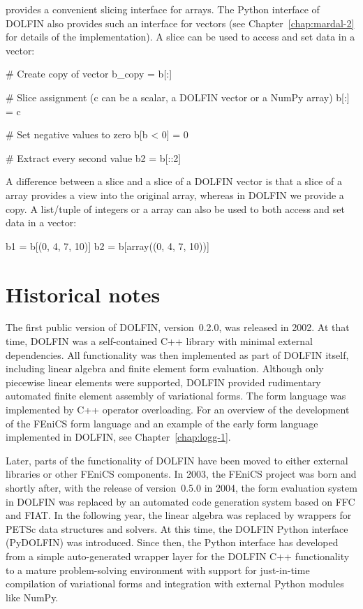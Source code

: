 \numpy provides a convenient slicing interface for \numpy arrays. The
Python interface of DOLFIN also provides such an interface for vectors
(see Chapter~\ref{chap:mardal-2} for details of the implementation). A
slice can be used to access and set data in a vector:
\begin{python}
# Create copy of vector
b_copy = b[:]

# Slice assignment (c can be a scalar, a DOLFIN vector or a NumPy array)
b[:] = c

# Set negative values to zero
b[b < 0] = 0

# Extract every second value
b2 = b[::2]
\end{python}
A difference between a \numpy slice and a slice of a DOLFIN vector is
that a slice of a \numpy array provides a view into the original array,
whereas in DOLFIN we provide a copy. A list/tuple of integers or a \numpy
array can also be used to both access and set data in a vector:
\begin{python}
b1 = b[(0, 4, 7, 10)]
b2 = b[array((0, 4, 7, 10))]
\end{python}

\section{Historical notes}

The first public version of DOLFIN, version~0.2.0, was released in
2002. At that time, DOLFIN was a self-contained C++ library with
minimal external dependencies. All functionality was then implemented
as part of DOLFIN itself, including linear algebra and finite element
form evaluation. Although only piecewise linear elements were
supported, DOLFIN provided rudimentary automated finite element
assembly of variational forms. The form language was implemented by
C++ operator overloading. For an overview of the development of the
FEniCS form language and an example of the early form language
implemented in DOLFIN, see Chapter~\ref{chap:logg-1}.

Later, parts of the functionality of DOLFIN have been moved to either
external libraries or other FEniCS components. In 2003, the FEniCS
project was born and shortly after, with the release of version~0.5.0 in
2004, the form evaluation system in DOLFIN was replaced by an automated
code generation system based on FFC and FIAT. In the following year,
the linear algebra was replaced by wrappers for PETSc data structures
and solvers. At this time, the DOLFIN Python interface (PyDOLFIN) was
introduced. Since then, the Python interface has developed from a simple
auto-generated wrapper layer for the DOLFIN C++ functionality to a mature
problem-solving environment with support for just-in-time compilation of
variational forms and integration with external Python modules like NumPy.

